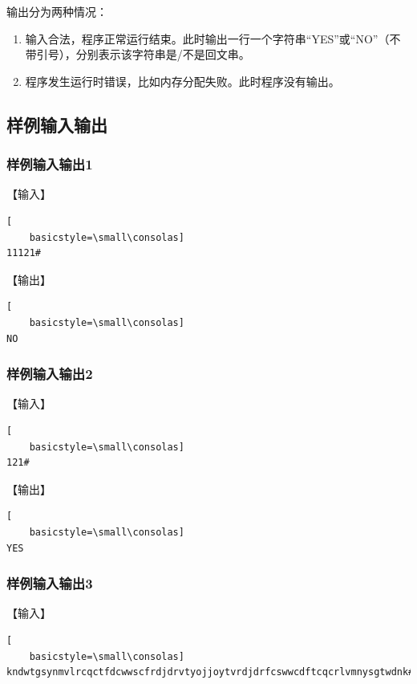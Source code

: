 \documentclass{article}
\begin{document}
输出分为两种情况：

\begin{enumerate}
    \item 输入合法，程序正常运行结束。此时输出一行一个字符串“YES”或“NO”（不带引号），分别表示该字符串是/不是回文串。
    \item 程序发生运行时错误，比如内存分配失败。此时程序没有输出。
\end{enumerate}

\subsection{样例输入输出}

\subsubsection{样例输入输出1}

【输入】

\begin{lstlisting}[
    basicstyle=\small\consolas]
11121#
\end{lstlisting}

【输出】

\begin{lstlisting}[
    basicstyle=\small\consolas]
NO
\end{lstlisting}

\subsubsection{样例输入输出2}

【输入】

\begin{lstlisting}[
    basicstyle=\small\consolas]
121#
\end{lstlisting}

【输出】

\begin{lstlisting}[
    basicstyle=\small\consolas]
YES
\end{lstlisting}

\subsubsection{样例输入输出3}

【输入】

\begin{lstlisting}[
    basicstyle=\small\consolas]
kndwtgsynmvlrcqctfdcwwscfrdjdrvtyojjoytvrdjdrfcswwcdftcqcrlvmnysgtwdnk#
\end{lstlisting}
\end{document}
